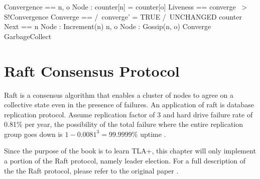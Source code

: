 \documentclass{report}
\begin{document}
\begin{tla}
Convergence == \A n, o \in Node : counter[n] = counter[o]
Liveness == converge ~> S!Convergence
Converge ==
    /\ converge' = TRUE
    /\ UNCHANGED counter  
Next ==
  \/ \E n \in Node : Increment(n)
  \/ \E n, o \in Node : Gossip(n, o)
  \/ Converge
  \/ GarbageCollect
\end{tla}
\begin{tlatex}
%
%
%
%
%
%
%
\end{tlatex}


\chapter{Raft Consensus Protocol}

Raft is a consensus algorithm that enables a cluster of nodes to agree on a
collective state even in the presence of failures. An application of raft
is database replication protocol. Assume replication factor of 3 and hard
drive failure rate of 0.81\% per year, the possibility of the total failure
where the entire replication group goes down is $1-0.0081^3 = 99.9999\%$ uptime
\cite{backblaze}.\newline

Since the purpose of the book is to learn TLA+, this chapter will only implement
a portion of the Raft protocol, namely leader election. For a full description
of the the Raft protocol, please refer to the original paper
\cite{raft}.\newline
\end{document}

